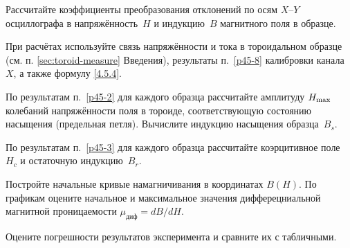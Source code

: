 \begin{lab:task}
\item Рассчитайте коэффициенты преобразования отклонений по осям
$X$--$Y$ осциллографа в напряжённость~$H$ и индукцию~$B$ магнитного поля
в образце.

При расчётах используйте связь напряжённости и тока в тороидальном образце
(см. п. \ref{sec:toroid-measure} Введения), результаты п.~\ref{p45-8} 
калибровки канала~$X$, а также формулу \eqref{4.5.4}.

\item 
По результатам п.~\ref{p45-2} для каждого образца рассчитайте 
амплитуду $H_{\rm max}$ колебаний напряжённости поля в тороиде, 
соответствующую состоянию насыщения (предельная петля).
Вычислите индукцию насыщения образца~$B_s$.

\item По результатам п.~\ref{p45-3} для каждого образца
рассчитайте коэрцитивное поле~$H_c$ и остаточную индукцию~$B_r$.

\item Постройте начальные кривые намагничивания в координатах $B(H)$.
По графикам оцените начальное и максимальное значения дифферецниальной
магнитной проницаемости $\mu_\text{диф}=dB/dH$.

\item Оцените погрешности результатов эксперимента 
и сравните их с табличными.
\end{lab:task}

